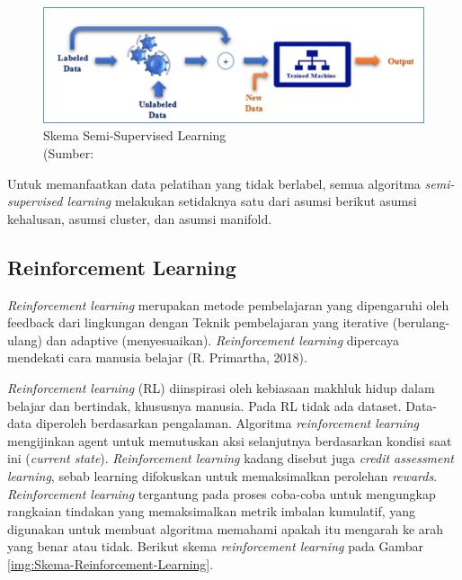 \begin{figure}[H]
	\vspace{-0.1cm}
	\begin{center}
		\includegraphics[width=1\columnwidth]{bab2/Gambar/Picture10.png}
	\end{center}
	\vspace{-0.2cm}
	\captionsetup{justification=centering}
	\caption{Skema Semi-Supervised Learning\\(Sumber: \citep{SpeechRecognitionUsingDeepNeuralNetworks}}\label{img:Skema-Semi-Supervised-Learning}
\end{figure}

Untuk memanfaatkan data pelatihan yang tidak berlabel, semua algoritma \textit{semi-supervised learning} melakukan setidaknya satu dari asumsi berikut asumsi kehalusan, asumsi cluster, dan asumsi manifold.

\subsection{Reinforcement Learning}
\hspace{1,2cm}\textit{Reinforcement learning} merupakan metode pembelajaran yang dipengaruhi oleh feedback dari lingkungan dengan Teknik pembelajaran yang iterative (berulang-ulang) dan adaptive (menyesuaikan). \textit{Reinforcement learning} dipercaya mendekati cara manusia belajar (R. Primartha, 2018). 

\textit{Reinforcement learning} (RL) diinspirasi oleh kebiasaan makhluk hidup dalam belajar dan bertindak, khususnya manusia. Pada RL tidak ada dataset. Data-data diperoleh berdasarkan pengalaman. Algoritma \textit{reinforcement learning} mengijinkan agent untuk memutuskan aksi selanjutnya berdasarkan kondisi saat ini (\textit{current state}). \textit{Reinforcement learning} kadang disebut juga \textit{credit assessment learning}, sebab learning difokuskan untuk memaksimalkan perolehan \textit{rewards}. \textit{Reinforcement learning} tergantung pada proses coba-coba untuk mengungkap rangkaian tindakan yang memaksimalkan metrik imbalan kumulatif, yang digunakan untuk membuat algoritma memahami apakah itu mengarah ke arah yang benar atau tidak. Berikut skema \textit{reinforcement learning} pada Gambar \ref{img:Skema-Reinforcement-Learning}. 

